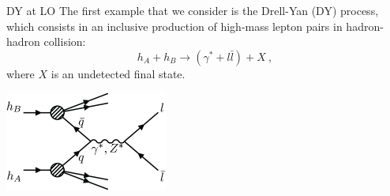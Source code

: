 \documentclass[t,handout,professionalfont,serif]{beamer}
\begin{document}
	
\begin{frame}{DY at LO}
	\scriptsize
	The first example that we consider is the Drell-Yan (DY) process, which consists in an inclusive production of high-mass lepton pairs in hadron-hadron collision:
	\begin{equation*}
		h_A + h_B \rightarrow ( \gamma^* + l \bar{l}) + X  \ ,
	\end{equation*}
	where $X$ is an undetected final state.
	\begin{center}
			\includegraphics[width=0.4\textwidth]{../tex/images/Drell-Yan-process-a-quark-of-one-hadron-and-an-antiquark-of-another-hadron-annihilate.png}
	\end{center}

\end{frame}	
\end{document}

